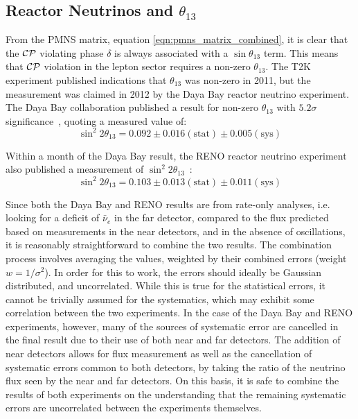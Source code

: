 \subsection{Reactor Neutrinos and \texorpdfstring{$\theta_{13}$}{θ₁₃}}
From the PMNS matrix, equation \eqref{eqn:pmns_matrix_combined}, it is clear that the $\mathcal{C}\mathcal{P}$ violating phase $\delta$ is always associated with a $\sin\theta_{13}$ term. This means that $\mathcal{C}\mathcal{P}$ violation in the lepton sector requires a non-zero $\theta_{13}$. The T2K~\citep{Abe2011} experiment published indications that $\theta_{13}$ was non-zero in 2011, but the measurement was claimed in 2012 by the Daya Bay reactor neutrino experiment. The Daya Bay collaboration published a result for non-zero $\theta_{13}$ with $5.2\sigma$ significance~\citep{An2012}, quoting a measured value of:
\begin{equation}\label{eqn:reactor_parameters_dyb}
\sin^2 2\theta_{13} = 0.092 \pm 0.016 (\mathrm{stat}) \pm 0.005 (\mathrm{sys})
\end{equation}

Within a month of the Daya Bay result, the RENO reactor neutrino experiment also published a measurement of $\sin^2 2\theta_{13}$~\citep{Ahn2012}:
\begin{equation}\label{eqn:reactor_parameters_reno}
\sin^2 2\theta_{13} = 0.103 \pm 0.013 (\mathrm{stat}) \pm 0.011 (\mathrm{sys})
\end{equation}

Since both the Daya Bay and RENO results are from rate-only analyses, i.e. looking for a deficit of $\bar{\nu}_e$ in the far detector, compared to the flux predicted based on measurements in the near detectors, and in the absence of oscillations, it is reasonably straightforward to combine the two results. The combination process involves averaging the values, weighted by their combined errors (weight $w = 1/\sigma^2$). In order for this to work, the errors should ideally be Gaussian distributed, and uncorrelated. While this is true for the statistical errors, it cannot be trivially assumed for the systematics, which may exhibit some correlation between the two experiments. In the case of the Daya Bay and RENO experiments, however, many of the sources of systematic error are cancelled in the final result due to their use of both near and far detectors. The addition of near detectors allows for flux measurement as well as the cancellation of systematic errors common to both detectors, by taking the ratio of the neutrino flux seen by the near and far detectors. On this basis, it is safe to combine the results of both experiments on the understanding that the remaining systematic errors are uncorrelated between the experiments themselves.

